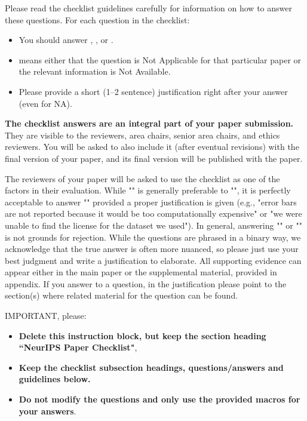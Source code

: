 \documentclass{article}
\theoremstyle{plain}
\theoremstyle{definition}
\theoremstyle{remark}
\begin{document}
Please read the checklist guidelines carefully for information on how to answer these questions. For each question in the checklist:
\begin{itemize}
    \item You should answer \answerYes{}, \answerNo{}, or \answerNA{}.
    \item \answerNA{} means either that the question is Not Applicable for that particular paper or the relevant information is Not Available.
    \item Please provide a short (1–2 sentence) justification right after your answer (even for NA). 
\end{itemize}

{\bf The checklist answers are an integral part of your paper submission.} They are visible to the reviewers, area chairs, senior area chairs, and ethics reviewers. You will be asked to also include it (after eventual revisions) with the final version of your paper, and its final version will be published with the paper.

The reviewers of your paper will be asked to use the checklist as one of the factors in their evaluation. While "\answerYes{}" is generally preferable to "\answerNo{}", it is perfectly acceptable to answer "\answerNo{}" provided a proper justification is given (e.g., "error bars are not reported because it would be too computationally expensive" or "we were unable to find the license for the dataset we used"). In general, answering "\answerNo{}" or "\answerNA{}" is not grounds for rejection. While the questions are phrased in a binary way, we acknowledge that the true answer is often more nuanced, so please just use your best judgment and write a justification to elaborate. All supporting evidence can appear either in the main paper or the supplemental material, provided in appendix. If you answer \answerYes{} to a question, in the justification please point to the section(s) where related material for the question can be found.

IMPORTANT, please:
\begin{itemize}
    \item {\bf Delete this instruction block, but keep the section heading ``NeurIPS Paper Checklist"},
    \item  {\bf Keep the checklist subsection headings, questions/answers and guidelines below.}
    \item {\bf Do not modify the questions and only use the provided macros for your answers}.
\end{itemize} 
 
\end{document}

